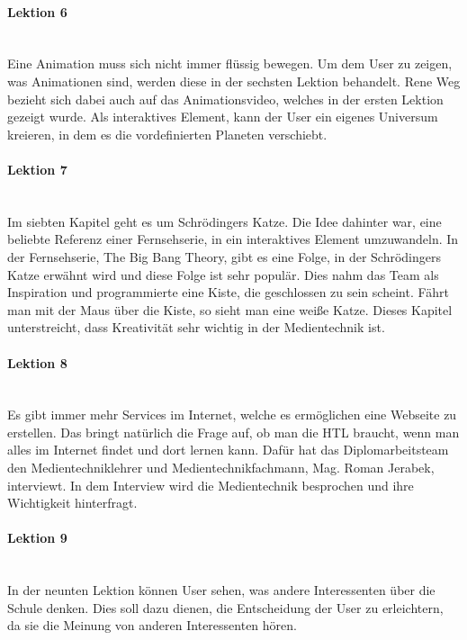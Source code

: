 \paragraph{Lektion 6}
\leavevmode \\
Eine Animation muss sich nicht immer flüssig bewegen. Um dem User zu zeigen, was Animationen sind, werden diese in der sechsten Lektion behandelt. Rene Weg bezieht sich dabei auch auf das Animationsvideo, welches in der ersten Lektion gezeigt wurde. Als interaktives Element, kann der User ein eigenes Universum kreieren, in dem es die vordefinierten Planeten verschiebt. 

\paragraph{Lektion 7}
\leavevmode \\
Im siebten Kapitel geht es um Schrödingers Katze. Die Idee dahinter war, eine beliebte Referenz einer Fernsehserie, in ein interaktives Element umzuwandeln. In der Fernsehserie, The Big Bang Theory, gibt es eine Folge, in der Schrödingers Katze erwähnt wird und diese Folge ist sehr populär. Dies nahm das Team als Inspiration und programmierte eine Kiste, die geschlossen zu sein scheint. Fährt man mit der Maus über die Kiste, so sieht man eine weiße Katze. Dieses Kapitel unterstreicht, dass Kreativität sehr wichtig in der Medientechnik ist.

\paragraph{Lektion 8}
\leavevmode \\
Es gibt immer mehr Services im Internet, welche es ermöglichen eine Webseite zu erstellen. Das bringt natürlich die Frage auf, ob man die HTL braucht, wenn man alles im Internet findet und dort lernen kann. Dafür hat das Diplomarbeitsteam den Medientechniklehrer und Medientechnikfachmann, Mag. Roman Jerabek, interviewt. In dem Interview wird die Medientechnik besprochen und ihre Wichtigkeit hinterfragt.

\paragraph{Lektion 9}
\leavevmode \\
In der neunten Lektion können User sehen, was andere Interessenten über die Schule denken. Dies soll dazu dienen, die Entscheidung der User zu erleichtern, da sie die Meinung von anderen Interessenten hören.


